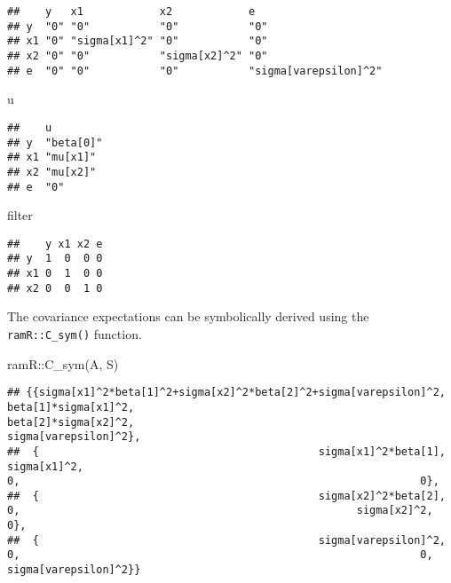 \documentclass[
]{book}
\newenvironment{Shaded}{\begin{snugshade}}{\end{snugshade}}
\newcommand{\FunctionTok}[1]{\textcolor[rgb]{0.00,0.00,0.00}{#1}}
\newcommand{\NormalTok}[1]{#1}
\newcommand{\SpecialCharTok}[1]{\textcolor[rgb]{0.00,0.00,0.00}{#1}}
\theoremstyle{definition}
\theoremstyle{definition}
\theoremstyle{definition}
\theoremstyle{remark}
\begin{document}
\begin{verbatim}
##    y   x1            x2            e                    
## y  "0" "0"           "0"           "0"                  
## x1 "0" "sigma[x1]^2" "0"           "0"                  
## x2 "0" "0"           "sigma[x2]^2" "0"                  
## e  "0" "0"           "0"           "sigma[varepsilon]^2"
\end{verbatim}

\begin{Shaded}
\begin{Highlighting}[]
\NormalTok{u}
\end{Highlighting}
\end{Shaded}

\begin{verbatim}
##    u        
## y  "beta[0]"
## x1 "mu[x1]" 
## x2 "mu[x2]" 
## e  "0"
\end{verbatim}

\begin{Shaded}
\begin{Highlighting}[]
\NormalTok{filter}
\end{Highlighting}
\end{Shaded}

\begin{verbatim}
##    y x1 x2 e
## y  1  0  0 0
## x1 0  1  0 0
## x2 0  0  1 0
\end{verbatim}

The covariance expectations
can be symbolically derived using the \texttt{ramR::C\_sym()} function.

\begin{Shaded}
\begin{Highlighting}[]
\NormalTok{ramR}\SpecialCharTok{::}\FunctionTok{C\_sym}\NormalTok{(A, S)}
\end{Highlighting}
\end{Shaded}

\begin{verbatim}
## {{sigma[x1]^2*beta[1]^2+sigma[x2]^2*beta[2]^2+sigma[varepsilon]^2,                                             beta[1]*sigma[x1]^2,                                             beta[2]*sigma[x2]^2,                                             sigma[varepsilon]^2},
##  {                                            sigma[x1]^2*beta[1],                                                     sigma[x1]^2,                                                               0,                                                               0},
##  {                                            sigma[x2]^2*beta[2],                                                               0,                                                     sigma[x2]^2,                                                               0},
##  {                                            sigma[varepsilon]^2,                                                               0,                                                               0,                                             sigma[varepsilon]^2}}
\end{verbatim}
\end{document}
